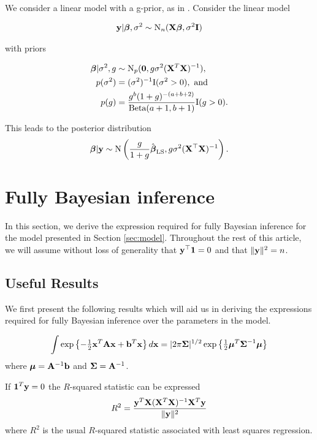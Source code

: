 \documentclass{amsart}[12pt]
\newcommand{\mgc}[1]{{\color{blue}#1}}
\begin{document}
We consider a linear model with a g-prior, as in \cite{Liang2008}. Consider the linear model

\begin{align*}
	{\bf y} | {\boldsymbol \beta}, \sigma^2 \sim \text{N}_n({\bf X} {\boldsymbol \beta}, \sigma^2 {\bf I}) 
\end{align*}

with priors

\begin{align*}
	{\boldsymbol\beta} | \sigma^2, g & \sim \text{N}_p({\bf 0}, g \sigma^2 ({\bf X}^T {\bf X})^{-1}),                     \\
	p(\sigma^2)          & = (\sigma^2)^{-1} \text{I}(\sigma^2 > 0), \text{ and }                    \\
	p(g)                 & = \frac{g^b (1 + g)^{-(a + b + 2)}}{\text{Beta}(a + 1, b + 1)} \text{I}(g > 0). 
\end{align*}



This leads to the posterior distribution
\[
	{\boldsymbol \beta} | {\bf y} \sim \text{N}\left(\frac{g}{1+g} \hat{{\boldsymbol \beta}}_{\text{LS}}, g \sigma^2 ({\bf X}^\top {\bf X})^{-1} \right).
\]

\section{Fully Bayesian inference}
\label{sec:full_bayes}

In this section, we derive the expression required for fully Bayesian inference for the model presented in
Section \ref{sec:model}. Throughout the rest of this article, we will assume without loss of generality that
${\bf y}^\top{\bf1} = 0$ and that $\|{\bf y}\|^2 = n$.

\subsection{Useful Results}	

We first present the following results which will aid us in deriving the expressions required for fully Bayesian
inference over the parameters in the model.

\begin{equation}\label{res:01}
	\int \exp\left\{ -\tfrac{1}{2}{\bf x}^T{\bf A}{\bf x} + {\bf b}^T{\bf x} \right\} d {\bf x} = |2\pi{\boldsymbol\Sigma}|^{1/2} \exp\left\{ \tfrac{1}{2}{\boldsymbol \mu}^T{\boldsymbol \Sigma}^{-1}{\boldsymbol \mu} \right\}
\end{equation}
where ${\boldsymbol \mu} = {\bf A}^{-1}{\bf b}$ and ${\boldsymbol \Sigma} = {\bf A}^{-1}$.
 
If ${\bf 1}^T{\bf y}=0$ the $R$-squared statistic can be expressed
\begin{equation} \label{res:02}
	R^2 = \frac{{\bf y}^T{\bf X}({\bf X}^T{\bf X})^{-1}{\bf X}^T{\bf y}}{\|{\bf y}\|^2}
\end{equation}
where $R^2$ is the usual $R$-squared statistic associated with least squares regression.
\end{document}
